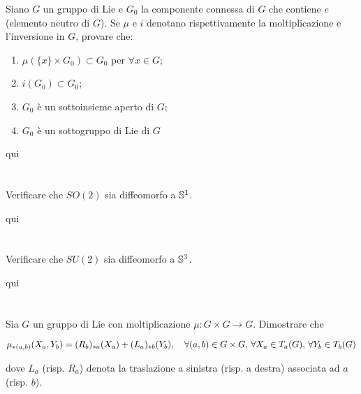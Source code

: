 \begin{tcolorbox}
	Siano $ G $ un gruppo di Lie e $ G_{0} $ la componente connessa di $ G $ che contiene $ e $ (elemento neutro di $ G $). Se $ \mu $ e $ i $ denotano rispettivamente la moltiplicazione e l'inversione in $ G $, provare che:
	
	\begin{enumerate}
		\item $ \mu(\{x\} \times G_{0}) \subset G_{0} $ per $ \forall x \in G $;
		
		\item $ i(G_{0}) \subset G_{0} $;
		
		\item $ G_{0} $ è un sottoinsieme aperto di $ G $;
		
		\item $ G_{0} $ è un sottogruppo di Lie di $ G $
	\end{enumerate}
\end{tcolorbox}

qui

\tocless\section{}\label{BONUS3-1}

\begin{tcolorbox}
	Verificare che $ SO(2) $ sia diffeomorfo a $ \S^{1} $.
\end{tcolorbox}

qui

\tocless\section{}\label{BONUS3-2}

\begin{tcolorbox}
	Verificare che $ SU(2) $ sia diffeomorfo a $ \S^{3} $.
\end{tcolorbox}

qui

\tocless\section{}\label{es3-7}

\begin{tcolorbox}
	Sia $ G $ un gruppo di Lie con moltiplicazione $ \mu : G \times G \to G $. Dimostrare che
	
	\begin{equation}
		\mu_{*(a,b)}(X_{a},Y_{b}) = (R_{b})_{*a}(X_{a}) + (L_{a})_{*b}(Y_{b}) \qcomma \forall (a,b) \in G \times G, \, \forall X_{a} \in T_{a}(G), \, \forall Y_{b} \in T_{b}(G)
	\end{equation}

	dove $ L_{a} $ (risp. $ R_{a} $) denota la traslazione a sinistra (risp. a destra) associata ad $ a $ (risp. $ b $).
\end{tcolorbox}

